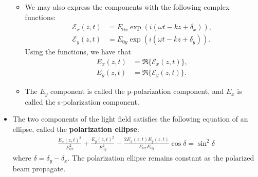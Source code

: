 \documentclass[10pt]{article}
\begin{document}
\begin{itemize}
\begin{itemize}
			\item We may also express the components with the following complex functions:
			\begin{align*}
				\mathcal{E}_x(z,t) &= E_{0x} \exp(i (\omega t - kz + \delta_x)), \\
				\mathcal{E}_y(z,t) &= E_{0y} \exp(i (\omega t - kz + \delta_y)).
			\end{align*}
			Using the functions, we have that
			\begin{align*}
				E_x(z,t) &= \Re \{ \mathcal{E}_x(z,t) \}, \\
				E_y(z,t) &= \Re \{ \mathcal{E}_y(z,t) \}.
			\end{align*}

			\item The $E_y$ component is called the p-polarization component, and $E_x$ is called the s-polarization component.
		\end{itemize}

		\item The two components of the light field satisfies the following equation of an ellipse, called the \textbf{polarization ellipse}:
		\begin{align*}
			\frac{E_x(z,t)^2}{E_{0x}^2} + \frac{E_y(z,t)^2}{E_{0y}^2} - \frac{2 E_x(z,t) E_y(z,t)}{E_{0x} E_{0y}}\cos\delta = \sin^2 \delta
		\end{align*}
		where $\delta = \delta_y - \delta_x$.  The polarization ellipse remains constant as the polarized beam propagate.


\end{itemize}
\end{document}
